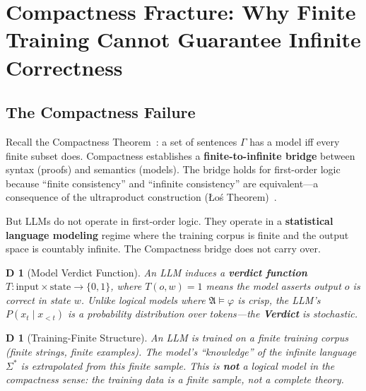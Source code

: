 \documentclass[12pt,a4paper]{article}
\newtheorem{definition}[theorem]Definition
\theoremstyle{remark}
\newcommand{\Struct}{\mathfrak{A}}
\begin{document}
\section{Compactness Fracture: Why Finite Training Cannot Guarantee Infinite Correctness}
\subsection{The Compactness Failure}
Recall the Compactness Theorem~\cite{chang_keisler,hodges_model}: a set of sentences \(\Gamma\) has a model iff every finite subset does. Compactness establishes a \textbf{finite-to-infinite bridge} between syntax (proofs) and semantics (models). The bridge holds for first-order logic because ``finite consistency'' and ``infinite consistency'' are equivalent---a consequence of the ultraproduct construction (Łoś Theorem)~\cite{los1955}.

But LLMs do not operate in first-order logic. They operate in a \textbf{statistical language modeling} regime where the training corpus is finite and the output space is countably infinite. The Compactness bridge does not carry over.

\begin{definition}[Model Verdict Function]
An LLM induces a \textbf{verdict function} \(T: \text{input} \times \text{state} \to \{0,1\}\), where \(T(o, w) = 1\) means the model asserts output \(o\) is correct in state \(w\). Unlike logical models where \(\Struct \models \varphi\) is crisp, the LLM's \(P(x_t \mid x_{<t})\) is a probability distribution over tokens---the \textbf{Verdict} is stochastic.
\end{definition}

\begin{definition}[Training-Finite Structure]
An LLM is trained on a finite training corpus (finite strings, finite examples). The model's ``knowledge'' of the infinite language \(\Sigma^*\) is extrapolated from this finite sample. This is \textbf{not} a logical model in the compactness sense: the training data is a finite sample, not a complete theory.
\end{definition}
\end{document}
